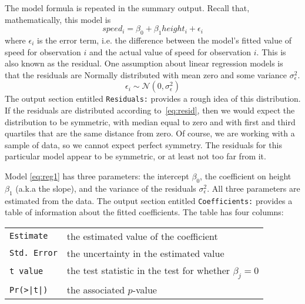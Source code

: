 \begin{figure}
\end{figure}

The model formula is repeated in the summary output. Recall that, mathematically,
this model is
\begin{equation}
 speed_i = \beta_0 + \beta_1 height_i + \epsilon_i    \label{eq:reg1}
\end{equation}
 where
$\epsilon_i$ is the error term, i.e. the difference between the
model's fitted value of speed for observation $i$ and the actual value
of speed for observation $i$.  This is also known as the residual. One
assumption about linear regression models is that the residuals are
Normally distributed with mean zero and some variance
$\sigma_{\epsilon}^2$.
\begin{equation}
 \epsilon_i \sim \mathcal{N} \left( 0, \sigma_{\epsilon}^2 \right) 
\label{eq:resid}
\end{equation}
The output section entitled \texttt{Residuals:} provides a rough idea
of this distribution. If the residuals are distributed according
to~\ref{eq:resid}, then we would expect the distribution to be
symmetric, with median equal to zero and with first and third
quartiles that are the same distance from zero. Of course, we are
working with a sample of data, so we cannot expect perfect symmetry.
The residuals for this particular model appear to be symmetric, or at
least not too far from it.

Model \ref{eq:reg1} has three parameters: the intercept $\beta_0$, the
coefficient on height $\beta_1$ (a.k.a the slope), and the variance of
the residuals $\sigma_{\epsilon}^2$.  All three parameters are
estimated from the data. The output section entitled
\texttt{Coefficients:} provides a table of information about the
fitted coefficients. The table has four columns:

\vspace{.1in}
\begin{tabular}{ll}
\texttt{Estimate}& the estimated value of the coefficient\\
\texttt{Std. Error}& the uncertainty in the estimated value\\
\texttt{t value} & the test statistic in the test for whether $\beta_j=0$\\
\texttt{Pr(>|t|)}& the associated $p$-value\\
\end{tabular}
\vspace{.1in}

